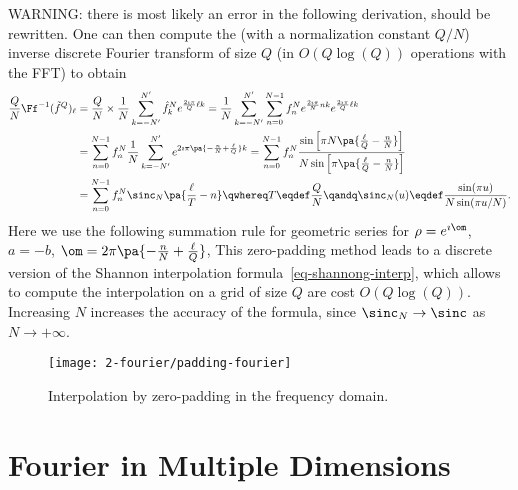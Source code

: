 WARNING: there is most likely an error in the following derivation, should be rewritten.
One can then compute the (with a normalization constant $Q/N$) inverse discrete Fourier transform of size $Q$ (in $O(Q \log(Q))$ operations with the FFT) to obtain
\begin{align*}
	\frac{Q}{N} \Ff^{-1}( \tilde f^Q )_\ell &= 
	\frac{Q}{N} \times \frac{1}{N} \sum_{k=-N'}^{N'} \hat f_k^N e^{ \frac{2\imath\pi}{Q} \ell k } 
	= \frac{1}{N} \sum_{k=-N'}^{N'} \sum_{n=0}^{N-1} f^N_n e^{\frac{2\imath\pi}{N} n k} e^{ \frac{2\imath\pi}{Q} \ell k }  \\
	&= \sum_{n=0}^{N-1} f^N_n \frac{1}{N} \sum_{k=-N'}^{N'} e^{ 2\imath\pi \pa{ -\frac{n}{N} + \frac{\ell}{Q} } k } 
	=  \sum_{n=0}^{N-1} f^N_n 
			\frac{ 
				\sin\left[ \pi N \pa{ \frac{\ell}{Q} - \frac{n}{N} } \right]  
			}{
				N \sin\left[ \pi \pa{ \frac{\ell}{Q} - \frac{n}{N} } \right]
			}  \\
	&= \sum_{n=0}^{N-1} f^N_n \sinc_N\pa{ \frac{\ell}{T} - n }
	\qwhereq
	T \eqdef \frac{Q}{N} \qandq \sinc_N(u) \eqdef \frac{ \sin(\pi u) }{ N \sin(\pi u /N) }.
\end{align*}
Here we use the following summation rule for geometric series for $\rho=e^{\imath \om}$, $a=-b$, $\om = 2\pi \pa{ -\frac{n}{N} + \frac{\ell}{Q} }$, 
This zero-padding method leads to a discrete version of the Shannon interpolation formula~\eqref{eq-shannong-interp}, which allows to compute the interpolation on a grid of size $Q$ are cost $O(Q\log(Q))$. Increasing $N$ increases the accuracy of the formula, since $\sinc_N \rightarrow \sinc$ as $N \rightarrow +\infty$.

\begin{figure}
\centering
\texttt{[image: 2-fourier/padding-fourier]}
\caption{\label{fig-padding-fourier}
Interpolation by zero-padding in the frequency domain.
}
\end{figure}

\section{Fourier in Multiple Dimensions}
\label{sec-fourier-multiple-dim}

